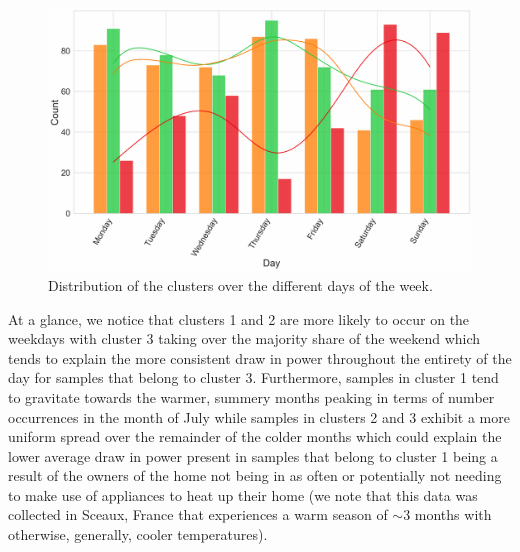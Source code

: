 \begin{adjustwidth}{-1.65cm}{-0.0cm}
\begin{enumerate}[label=Step 2.\arabic*:, leftmargin=*]
        \begin{figure}[H]
            \centering
            \includegraphics[width=\textwidth]{Images/Chapter 6/UCID/UCID-HDBSCAN-V3.1.pdf}
            \caption{Distribution of the clusters over the different days of the week.}
            \label{fig:UCID-HDBSCAN-V3}
        \end{figure}
        
        \noindent \newline At a glance, we notice that clusters 1 and 2 are more likely to occur on the weekdays with cluster 3 taking over the majority share of the weekend which tends to explain the more consistent draw in power throughout the entirety of the day for samples that belong to cluster 3. Furthermore, samples in cluster 1 tend to gravitate towards the warmer, summery months peaking in terms of number occurrences in the month of July while samples in clusters 2 and 3 exhibit a more uniform spread over the remainder of the colder months which could explain the lower average draw in power present in samples that belong to cluster 1 being a result of the owners of the home not being in as often or potentially not needing to make use of appliances to heat up their home (we note that this data was collected in Sceaux, France that experiences a warm season of $\sim \! 3$  months with otherwise, generally, cooler temperatures). 
        

\end{enumerate}
\end{adjustwidth}
